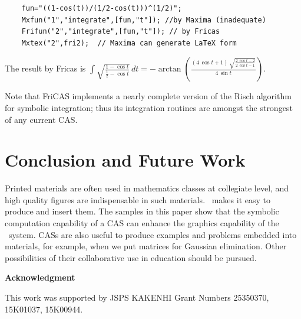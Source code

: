 \documentclass[11pt]{article}
\begin{document}
{\small
\begin{verbatim}
    fun="((1-cos(t))/(1/2-cos(t)))^(1/2)";
    Mxfun("1","integrate",[fun,"t"]); //by Maxima (inadequate)
    Frifun("2","integrate",[fun,"t"]); // by Fricas
    Mxtex("2",fri2);  // Maxima can generate LaTeX form
\end{verbatim}\vspace{-1mm}
}

\vspace{-2mm}

\noindent
The result by Fricas is $\displaystyle\int \sqrt{\frac{1-\cos
    t}{\frac{1}{2}-\cos t}} \,dt=-\arctan \left(\frac{\left(4\,\cos
      t+1\right)\,\sqrt{\frac{2\,\cos  t-2}{2\,\cos t-1}}}{4\,\sin t}\right) $.

\vspace{1mm}

Note that FriCAS implements a nearly complete version of the Risch algorithm for
symbolic integration; thus its integration routines are amongst the strongest of
any current CAS.

\section{Conclusion and Future Work}

Printed materials are often used in mathematics classes at collegiate level, and 
high quality figures are indispensable in such materials. \ketcindy\ makes it easy
to produce and insert them.
The samples in this paper show that the symbolic computation capability of a CAS
can enhance the graphics capability of the \ketcindy\ system. 
CASs are also useful to produce examples and problems embedded into materials, for example, when we put matrices for Gaussian elimination.
Other possibilities of their collaborative use in education should be pursued.


\vspace{4mm}

\noindent
{\bf Acknowledgment}

\noindent
This work was supported by JSPS KAKENHI Grant Numbers 
25350370, 15K01037, 15K00944.
\end{document}
